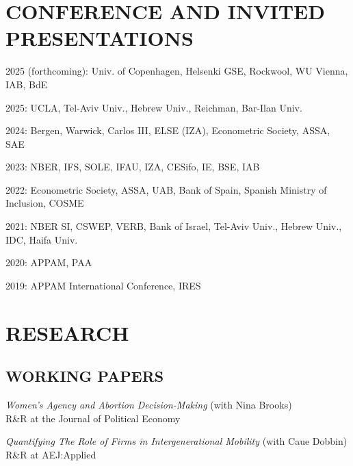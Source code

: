 \documentclass[margin]{res} %
\begin{document}
\begin{resume}
 
\section{CONFERENCE AND INVITED PRESENTATIONS} 
\vspace{2em}

 2025 (forthcoming): Univ. of Copenhagen, Helsenki GSE, Rockwool, WU Vienna, IAB, BdE

 2025: UCLA, Tel-Aviv Univ., Hebrew Univ., Reichman, Bar-Ilan Univ.

 2024: Bergen, Warwick, Carlos III, ELSE (IZA), Econometric Society, ASSA, SAE

 2023: NBER, IFS, SOLE, IFAU, IZA, CESifo, IE, BSE, IAB

 2022: Econometric Society, ASSA, UAB, Bank of Spain, Spanish Ministry of Inclusion, COSME

 2021: NBER SI, CSWEP, VERB, Bank of Israel, Tel-Aviv Univ., Hebrew Univ., IDC, Haifa Univ.

 2020: APPAM, PAA

 2019: APPAM International Conference, IRES


\section{RESEARCH} 

\subsection{WORKING PAPERS}

\textit{Women's Agency and Abortion Decision-Making} (with Nina Brooks) \\
R\&R at the Journal of Political Economy

\textit{Quantifying The Role of Firms in Intergenerational Mobility} (with Caue Dobbin) \\
R\&R at AEJ:Applied


\end{resume}
\end{document}
